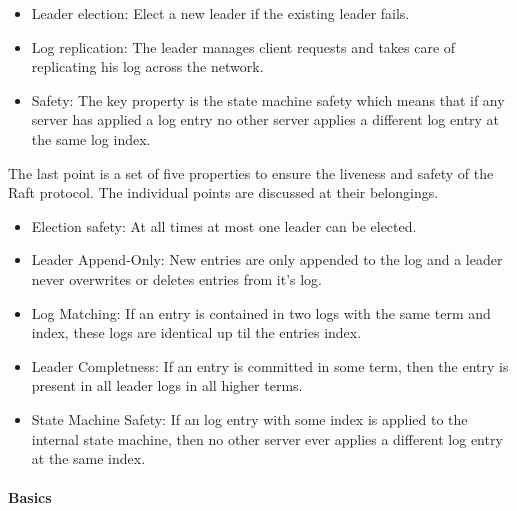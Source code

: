 \begin{itemize}
\item Leader election: Elect a new leader if the existing leader fails.
\item Log replication: The leader manages client requests and takes care
  of replicating his log across the network.
\item Safety:  The key property is the state machine safety which means that
  if any server has applied a log entry no other server applies a
  different log entry at the same log index.
\end{itemize}

The last point is a set of five properties to ensure the liveness and
safety of the Raft protocol. The individual points are discussed at
their belongings.~\cite{ongaro2014search}

\begin{itemize}
\item Election safety: At all times at most one leader can be elected.
\item Leader Append-Only: New entries are only appended to the log and
  a leader never overwrites or deletes entries from it's log.
\item Log Matching: If an entry is contained in two logs with the same
  term and index, these logs are identical up til the entries index.
\item Leader Completness: If an entry is committed in some term, then the
  entry is present in all leader logs in all higher terms.
\item State Machine Safety: If an log entry with some index is applied to
  the internal state machine, then no other server ever applies a
  different log entry at the same index.
\end{itemize}

\paragraph{Basics}

